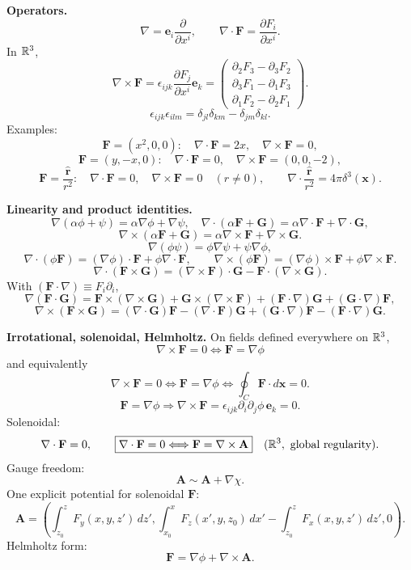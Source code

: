 \noindent\textbf{Operators.}
\[
\nabla=\mathbf{e}_i\frac{\partial}{\partial x^i},\qquad
\nabla\cdot\mathbf{F}=\frac{\partial F_i}{\partial x^i}.
\]
In $\mathbb{R}^3$,
\[
\nabla\times\mathbf{F}
=\epsilon_{ijk}\frac{\partial F_j}{\partial x^i}\mathbf{e}_k
=\begin{pmatrix}
\partial_2F_3-\partial_3F_2\\
\partial_3F_1-\partial_1F_3\\
\partial_1F_2-\partial_2F_1
\end{pmatrix}.
\]
\[
\epsilon_{ijk}\epsilon_{ilm}
=\delta_{jl}\delta_{km}-\delta_{jm}\delta_{kl}.
\]
Examples:
\[
\mathbf{F}=(x^2,0,0):\quad\nabla\cdot\mathbf{F}=2x,\quad\nabla\times\mathbf{F}=0,
\]
\[
\mathbf{F}=(y,-x,0):\quad\nabla\cdot\mathbf{F}=0,\quad\nabla\times\mathbf{F}=(0,0,-2),
\]
\[
\mathbf{F}=\frac{\hat{\mathbf{r}}}{r^2}:\quad
\nabla\cdot\mathbf{F}=0,\quad\nabla\times\mathbf{F}=0\quad(r\ne0),
\qquad
\nabla\cdot\frac{\hat{\mathbf{r}}}{r^2}=4\pi\delta^3(\mathbf{x}).
\]

\noindent\textbf{Linearity and product identities.}
\[
\nabla(\alpha\phi+\psi)=\alpha\nabla\phi+\nabla\psi,
\quad
\nabla\cdot(\alpha\mathbf{F}+\mathbf{G})
=\alpha\nabla\cdot\mathbf{F}+\nabla\cdot\mathbf{G},
\]
\[
\nabla\times(\alpha\mathbf{F}+\mathbf{G})
=\alpha\nabla\times\mathbf{F}+\nabla\times\mathbf{G}.
\]
\[
\nabla(\phi\psi)=\phi\nabla\psi+\psi\nabla\phi,
\]
\[
\nabla\cdot(\phi\mathbf{F})
=(\nabla\phi)\cdot\mathbf{F}+\phi\nabla\cdot\mathbf{F},
\qquad
\nabla\times(\phi\mathbf{F})
=(\nabla\phi)\times\mathbf{F}+\phi\nabla\times\mathbf{F}.
\]
\[
\nabla\cdot(\mathbf{F}\times\mathbf{G})
=(\nabla\times\mathbf{F})\cdot\mathbf{G}
-\mathbf{F}\cdot(\nabla\times\mathbf{G}).
\]
With $(\mathbf{F}\cdot\nabla)\equiv F_i\partial_i$,
\[
\nabla(\mathbf{F}\cdot\mathbf{G})
=\mathbf{F}\times(\nabla\times\mathbf{G})
+\mathbf{G}\times(\nabla\times\mathbf{F})
+(\mathbf{F}\cdot\nabla)\mathbf{G}
+(\mathbf{G}\cdot\nabla)\mathbf{F},
\]
\[
\nabla\times(\mathbf{F}\times\mathbf{G})
=(\nabla\cdot\mathbf{G})\mathbf{F}
-(\nabla\cdot\mathbf{F})\mathbf{G}
+(\mathbf{G}\cdot\nabla)\mathbf{F}
-(\mathbf{F}\cdot\nabla)\mathbf{G}.
\]

\noindent\textbf{Irrotational, solenoidal, Helmholtz.}
On fields defined everywhere on $\mathbb{R}^3$,
\[
\boxed{\nabla\times\mathbf{F}=0\Longleftrightarrow\mathbf{F}=\nabla\phi}
\]
and equivalently
\[
\nabla\times\mathbf{F}=0
\Longleftrightarrow
\mathbf{F}=\nabla\phi
\Longleftrightarrow
\oint_C\mathbf{F}\cdot d\mathbf{x}=0.
\]
\[
\mathbf{F}=\nabla\phi\Rightarrow
\nabla\times\mathbf{F}
=\epsilon_{ijk}\partial_i\partial_j\phi\,\mathbf{e}_k=0.
\]
Solenoidal:
\[
\nabla\cdot\mathbf{F}=0,\qquad
\boxed{\nabla\cdot\mathbf{F}=0\Longleftrightarrow\mathbf{F}=\nabla\times\mathbf{A}}
\quad(\mathbb{R}^3,\text{ global regularity}).
\]
Gauge freedom:
\[
\mathbf{A}\sim\mathbf{A}+\nabla\chi.
\]
One explicit potential for solenoidal $\mathbf{F}$:
\[
\mathbf{A}=
\left(
\int_{z_0}^{z}F_y(x,y,z')\,dz',
\int_{x_0}^{x}F_z(x',y,z_0)\,dx'
-\int_{z_0}^{z}F_x(x,y,z')\,dz',
0\right).
\]
Helmholtz form:
\[
\mathbf{F}=\nabla\phi+\nabla\times\mathbf{A}.
\]

